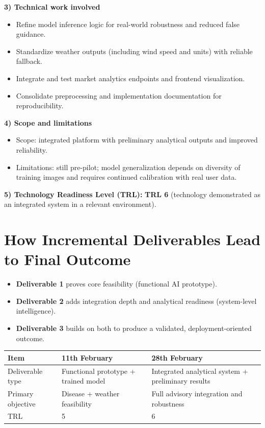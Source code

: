\documentclass[10pt,a4paper]{article}
\begin{document}
\textbf{3) Technical work involved}
\begin{itemize}[noitemsep]
  \item Refine model inference logic for real-world robustness and reduced false guidance.
  \item Standardize weather outputs (including wind speed and units) with reliable fallback.
  \item Integrate and test market analytics endpoints and frontend visualization.
  \item Consolidate preprocessing and implementation documentation for reproducibility.
\end{itemize}

\textbf{4) Scope and limitations}
\begin{itemize}[noitemsep]
  \item Scope: integrated platform with preliminary analytical outputs and improved reliability.
  \item Limitations: still pre-pilot; model generalization depends on diversity of training images and requires continued calibration with real user data.
\end{itemize}

\textbf{5) Technology Readiness Level (TRL):} \textbf{TRL 6} (technology demonstrated as an integrated system in a relevant environment).

\section*{How Incremental Deliverables Lead to Final Outcome}
\begin{itemize}[noitemsep]
  \item \textbf{Deliverable 1} proves core feasibility (functional AI prototype).
  \item \textbf{Deliverable 2} adds integration depth and analytical readiness (system-level intelligence).
  \item \textbf{Deliverable 3} builds on both to produce a validated, deployment-oriented outcome.
\end{itemize}

\begin{table}[h]
\centering
\small
\begin{tabular}{@{}lll@{}}
\toprule
\textbf{Item} & \textbf{11th February} & \textbf{28th February} \\
\midrule
Deliverable type & Functional prototype + trained model & Integrated analytical system + preliminary results \\
Primary objective & Disease + weather feasibility & Full advisory integration and robustness \\
TRL & 5 & 6 \\
\bottomrule
\end{tabular}
\end{table}
\end{document}
